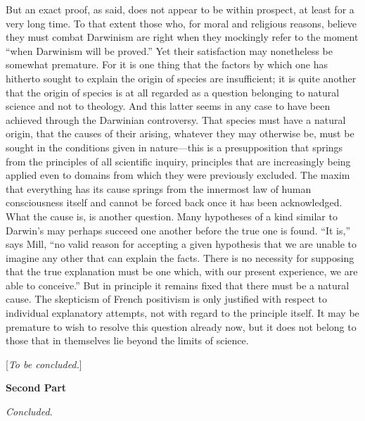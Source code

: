 \documentclass[12pt,a4paper]{article}
\begin{document}
But an exact proof, as said, does not appear to be within prospect,
at least for a very long time. To that extent those who, for moral
and religious reasons, believe they must combat Darwinism are right
when they mockingly refer to the moment ``when Darwinism will be
proved.'' Yet their satisfaction may nonetheless be somewhat
premature. For it is one thing that the factors by which one has
hitherto sought to explain the origin of species are insufficient; it
is quite another that the origin of species is at all regarded as a
question belonging to natural science and not to theology. And this
latter seems in any case to have been achieved through the Darwinian
controversy. That species must have a natural origin, that the causes
of their arising, whatever they may otherwise be, must be sought in
the conditions given in nature---this is a presupposition that springs
from the principles of all scientific inquiry, principles that are
increasingly being applied even to domains from which they were
previously excluded. The maxim that everything has its cause springs
from the innermost law of human consciousness itself and cannot be
forced back once it has been acknowledged. What the cause is, is
another question. Many hypotheses of a kind similar to Darwin's may
perhaps succeed one another before the true one is found. ``It is,''
says Mill, ``no valid reason for accepting a given hypothesis that we
are unable to imagine any other that can explain the facts. There is
no necessity for supposing that the true explanation must be one which,
with our present experience, we are able to conceive.'' But in
principle it remains fixed that there must be a natural cause. The
skepticism of French positivism is only justified with respect to
individual explanatory attempts, not with regard to the principle
itself. It may be premature to wish to resolve this question already
now, but it does not belong to those that in themselves lie beyond
the limits of science.

\begin{center}
[\emph{To be concluded.}]
\end{center}


\bigskip
\begin{center}
\textbf{Second Part}
\end{center}
\medskip

\noindent \emph{Concluded.}
\end{document}
